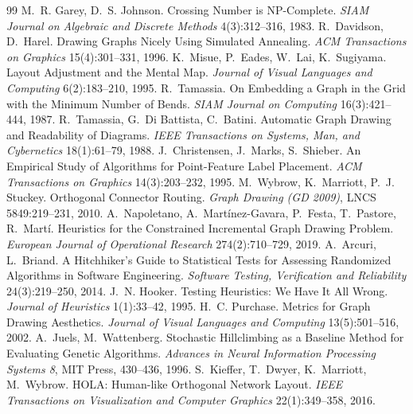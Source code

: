 \documentclass[11pt]{article}
\begin{document}
\begin{thebibliography}{99}
 M.~R. Garey, D.~S. Johnson. Crossing Number is NP-Complete. \emph{SIAM Journal on
 Algebraic and Discrete Methods} 4(3):312--316, 1983.
 R.~Davidson, D.~Harel. Drawing Graphs Nicely Using Simulated Annealing. \emph{ACM
 Transactions on Graphics} 15(4):301--331, 1996.
 K.~Misue, P.~Eades, W.~Lai, K.~Sugiyama. Layout Adjustment and the Mental Map.
 \emph{Journal of Visual Languages and Computing} 6(2):183--210, 1995.
 R.~Tamassia. On Embedding a Graph in the Grid with the Minimum Number of
 Bends. \emph{SIAM Journal on Computing} 16(3):421--444, 1987.
 R.~Tamassia, G.~Di Battista, C.~Batini. Automatic Graph Drawing and Readability
 of Diagrams. \emph{IEEE Transactions on Systems, Man, and Cybernetics} 18(1):61--79, 1988.
 J.~Christensen, J.~Marks, S.~Shieber. An Empirical Study of Algorithms for
 Point-Feature Label Placement. \emph{ACM Transactions on Graphics} 14(3):203--232, 1995.
 M.~Wybrow, K.~Marriott, P.~J. Stuckey. Orthogonal Connector Routing. \emph{Graph
 Drawing (GD 2009)}, LNCS 5849:219--231, 2010.
 A.~Napoletano, A.~Mart\'inez-Gavara, P.~Festa, T.~Pastore, R.~Mart\'i.
 Heuristics for the Constrained Incremental Graph Drawing Problem. \emph{European Journal of
 Operational Research} 274(2):710--729, 2019.
 A.~Arcuri, L.~Briand. A Hitchhiker's Guide to Statistical Tests for Assessing
 Randomized Algorithms in Software Engineering. \emph{Software Testing, Verification and
 Reliability} 24(3):219--250, 2014.
 J.~N. Hooker. Testing Heuristics: We Have It All Wrong. \emph{Journal of
 Heuristics} 1(1):33--42, 1995.
 H.~C. Purchase. Metrics for Graph Drawing Aesthetics. \emph{Journal of
 Visual Languages and Computing} 13(5):501--516, 2002.
 A.~Juels, M.~Wattenberg. Stochastic Hillclimbing as a Baseline Method for
 Evaluating Genetic Algorithms. \emph{Advances in Neural Information Processing Systems 8},
 MIT Press, 430--436, 1996.
 S.~Kieffer, T.~Dwyer, K.~Marriott, M.~Wybrow. HOLA: Human-like Orthogonal
 Network Layout. \emph{IEEE Transactions on Visualization and Computer Graphics}
 22(1):349--358, 2016.
\end{thebibliography}
\end{document}
